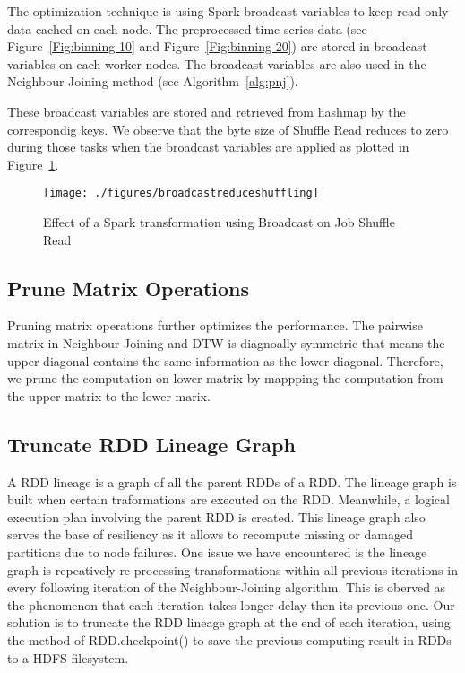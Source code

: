 The optimization technique is using Spark broadcast variables to keep read-only data  cached on each node. The preprocessed time series data (see Figure~\ref{Fig:binning-10} and Figure~\ref{Fig:binning-20}) are stored in broadcast variables on each worker nodes. The broadcast variables are also used in the Neighbour-Joining method (see Algorithm~\ref{alg:pnj}). 

These broadcast variables are stored and retrieved from \textsf{hashmap} by the correspondig keys. We observe that the byte size of \textsf{Shuffle Read} reduces to zero during those tasks when the broadcast variables are applied as plotted in Figure~\ref{fig:broadcastreduceshuffling}.

\begin{figure}
	\centering
	\texttt{[image: ./figures/broadcastreduceshuffling]}
	\caption{ Effect of a Spark transformation using Broadcast on Job Shuffle Read  }
	\label{fig:broadcastreduceshuffling}
\end{figure}



\subsection{Prune Matrix Operations}
Pruning matrix operations further optimizes the performance. The pairwise matrix in Neighbour-Joining and DTW is diagnoally symmetric that means the upper diagonal contains the same information as the lower diagonal. Therefore, we prune the computation on lower matrix by mappping the computation from the upper matrix to the lower marix.  

\subsection{Truncate RDD Lineage Graph}
A RDD lineage is a graph of all the parent RDDs of a RDD. The lineage graph is built when certain traformations are executed on the RDD. Meanwhile, a logical execution plan involving the parent RDD is created. This lineage graph also serves the base of resiliency as it allows to recompute missing or damaged partitions due to node failures. One issue we have encountered is the lineage graph is repeatively re-processing transformations within all previous iterations in every following iteration of the Neighbour-Joining algorithm. This is oberved as the phenomenon that each iteration takes longer delay then its previous one. Our solution is to truncate the RDD lineage graph at the end of each iteration, using the method of \textsf{RDD.checkpoint()} to save the previous computing result in RDDs to a HDFS filesystem. 

